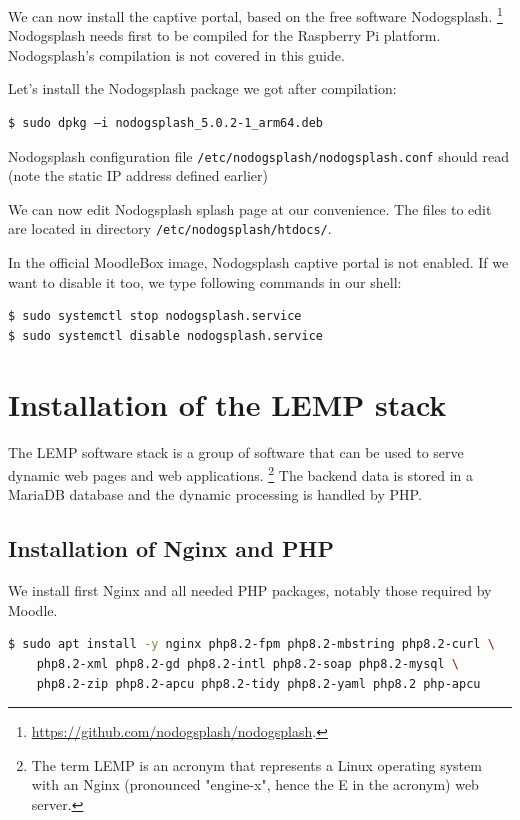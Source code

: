 \documentclass[12pt]{article}
\begin{document}
We can now install the captive portal, based on the free software Nodogsplash.%
\footnote{\url{https://github.com/nodogsplash/nodogsplash}.}
Nodogsplash needs first to be compiled for the Raspberry Pi platform.
Nodogsplash's compilation is not covered in this guide.

Let's install the Nodogsplash package we got after compilation:
\begin{lstlisting}[language=bash]
$ sudo dpkg –i nodogsplash_5.0.2-1_arm64.deb
\end{lstlisting}
Nodogsplash configuration file \lstinline{/etc/nodogsplash/nodogsplash.conf} should read (note the static IP address defined earlier)


We can now edit Nodogsplash splash page at our convenience.
The files to edit are located in directory \lstinline{/etc/nodogsplash/htdocs/}.

In the official MoodleBox image, Nodogsplash captive portal is not enabled.
If we want to disable it too, we type following commands in our shell:
\begin{lstlisting}[language=bash]
$ sudo systemctl stop nodogsplash.service
$ sudo systemctl disable nodogsplash.service
\end{lstlisting}

\section{Installation of the LEMP stack}

The LEMP software stack is a group of software that can be used to serve dynamic web pages and web applications.%
\footnote{The term LEMP is an acronym that represents a Linux operating system with an Nginx (pronounced "engine-x", hence the E in the acronym) web server.}
The backend data is stored in a MariaDB database and the dynamic processing is handled by PHP.

\subsection{Installation of Nginx and PHP}\label{ssec-lemp}

We install first Nginx and all needed PHP packages, notably those required by Moodle.

\begin{lstlisting}[language=bash]
$ sudo apt install -y nginx php8.2-fpm php8.2-mbstring php8.2-curl \
    php8.2-xml php8.2-gd php8.2-intl php8.2-soap php8.2-mysql \
    php8.2-zip php8.2-apcu php8.2-tidy php8.2-yaml php8.2 php-apcu
\end{lstlisting}
\end{document}
